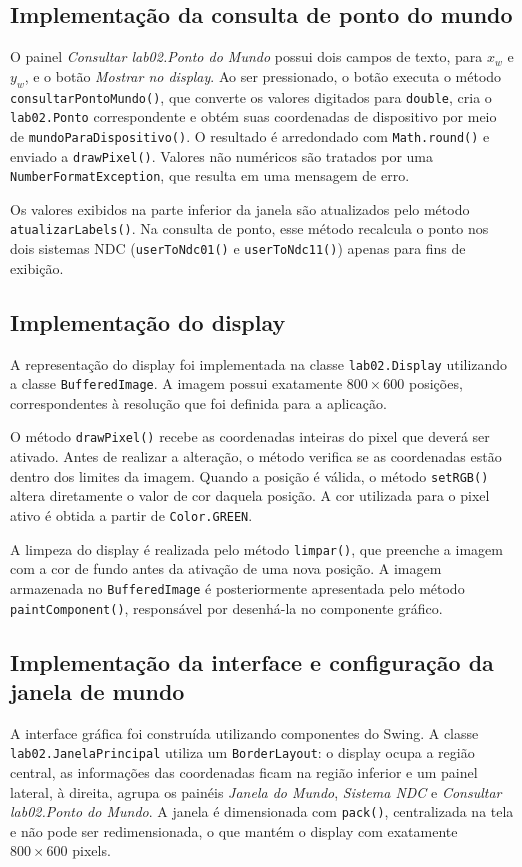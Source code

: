 \subsection{Implementação da consulta de ponto do mundo}
O painel \textit{Consultar lab02.Ponto do Mundo} possui dois campos de texto, para $x_w$ e $y_w$, e o botão \textit{Mostrar no display}. Ao ser pressionado, o botão executa o método \texttt{consultarPontoMundo()}, que converte os valores digitados para \texttt{double}, cria o \texttt{lab02.Ponto} correspondente e obtém suas coordenadas de dispositivo por meio de \texttt{mundoParaDispositivo()}. O resultado é arredondado com \texttt{Math.round()} e enviado a \texttt{drawPixel()}. Valores não numéricos são tratados por uma \texttt{NumberFormatException}, que resulta em uma mensagem de erro.

Os valores exibidos na parte inferior da janela são atualizados pelo método \texttt{atualizarLabels()}. Na consulta de ponto, esse método recalcula o ponto nos dois sistemas NDC (\texttt{userToNdc01()} e \texttt{userToNdc11()}) apenas para fins de exibição.

\subsection{Implementação do display}
A representação do display foi implementada na classe \texttt{lab02.Display} utilizando a classe \texttt{BufferedImage}. A imagem possui exatamente $800 \times 600$ posições, correspondentes à resolução que foi definida para a aplicação.

O método \texttt{drawPixel()} recebe as coordenadas inteiras do pixel que deverá ser ativado. Antes de realizar a alteração, o método verifica se as coordenadas estão dentro dos limites da imagem. Quando a posição é válida, o método \texttt{setRGB()} altera diretamente o valor de cor daquela posição. A cor utilizada para o pixel ativo é obtida a partir de \texttt{Color.GREEN}.

A limpeza do display é realizada pelo método \texttt{limpar()}, que preenche a imagem com a cor de fundo antes da ativação de uma nova posição. A imagem armazenada no \texttt{BufferedImage} é posteriormente apresentada pelo método \texttt{paintComponent()}, responsável por desenhá-la no componente gráfico.

\subsection{Implementação da interface e configuração da janela de mundo}
A interface gráfica foi construída utilizando componentes do Swing. A classe \texttt{lab02.JanelaPrincipal} utiliza um \texttt{BorderLayout}: o display ocupa a região central, as informações das coordenadas ficam na região inferior e um painel lateral, à direita, agrupa os painéis \textit{Janela do Mundo}, \textit{Sistema NDC} e \textit{Consultar lab02.Ponto do Mundo}. A janela é dimensionada com \texttt{pack()}, centralizada na tela e não pode ser redimensionada, o que mantém o display com exatamente $800 \times 600$ pixels.

